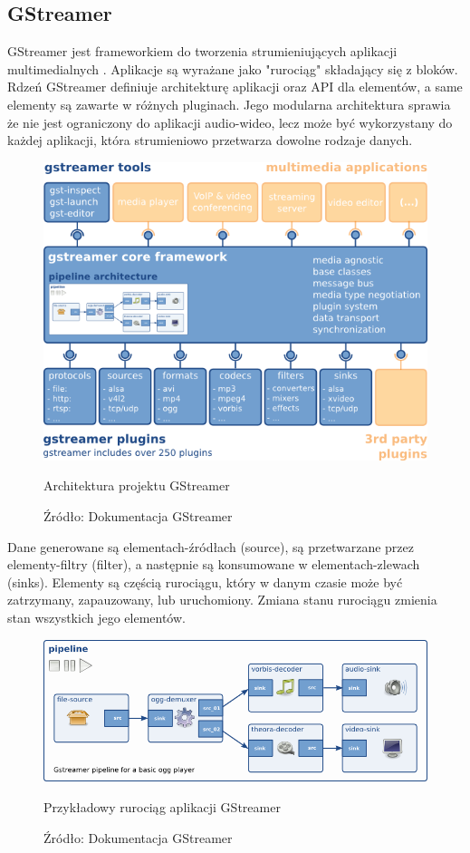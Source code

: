 \subsection{GStreamer}

GStreamer jest frameworkiem do tworzenia strumieniujących aplikacji multimedialnych
\cite{gstreamer}. Aplikacje są wyrażane jako "rurociąg" składający się z bloków. Rdzeń GStreamer
definiuje architekturę aplikacji oraz API dla elementów, a same elementy są zawarte w różnych
pluginach. Jego modularna architektura sprawia że nie jest ograniczony do aplikacji audio-wideo,
lecz może być wykorzystany do każdej aplikacji, która strumieniowo przetwarza dowolne rodzaje
danych.

\begin{figure}[H]
    \centering
    \includegraphics[width=.5\textwidth]{img/technologie/gstreamer-overview}
    \caption{Architektura projektu GStreamer}
    \caption*{Źródło: Dokumentacja GStreamer\cite{gstreamer}}
\end{figure}

Dane generowane są elementach-źródłach (source), są przetwarzane przez elementy-filtry (filter), a
następnie są konsumowane w elementach-zlewach (sinks). Elementy są częścią rurociągu, który w danym
czasie może być zatrzymany, zapauzowany, lub uruchomiony. Zmiana stanu rurociągu zmienia stan
wszystkich jego elementów.

\begin{figure}[H]
    \centering
    \includegraphics[width=.7\textwidth]{img/technologie/simple-player}
    \caption{Przykładowy rurociąg aplikacji GStreamer}
    \caption*{Źródło: Dokumentacja GStreamer\cite{gstreamer}}
    \label{fig:gstreamer_example_pipeline}
\end{figure}

